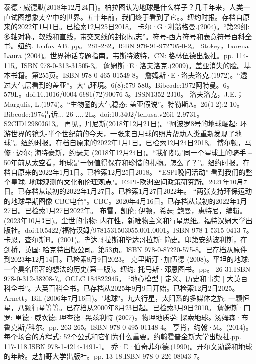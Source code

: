 \begin{enumerate}
 泰德·威德默(2018年12月24日)。柏拉图认为地球是什么样子？几千年来，人类一直试图想象太空中的世界。五十年前，我们终于看到了它。。纽约时报。存档自原来的2022年1月1日。已检索12月25日2018。
 卡尔·G·利翁格曼.(2004)。“第29组: 多轴对称，软线和直线，带交叉线的封闭标志”。符号-西方符号和表意符号百科全书。纽约: Ionfox AB. pp。 281-282。ISBN 978-91-972705-0-2。
 Stokey，Lorena Laura (2004)。世界神话专题指南。韦斯特波特，CN: 格林伍德出版社。pp. 114-115。ISBN 978-0-313-31505-3。
 詹姆斯·E·洛夫洛克.(2009)。盖亚消失的脸。基本书籍。第255页。ISBN 978-0-465-01549-8。
 詹姆斯·E·洛夫洛克.(1972)。“透过大气层看到的盖亚”。大气环境。6(8):579-580。Bibcode:1972阿特曼。6。579L。doi:10.1016/0004-6981(72)90076-5。ISSN1352-2310。 
 洛夫洛克，J.E.；Margulis, L.(1974)。“生物圈的大气稳态: 盖亚假说”。特勒斯A。26(1-2):2-10。Bibcode:1974告诉... 26 .... 2L。doi:10.3402/tellusa.v26i1-2.9731。S2CID129803613。 
 再见，丹尼斯(2018年12月21日)。“阿波罗8号的地球崛起: 环游世界的镜头-半个世纪前的今天，一张来自月球的照片帮助人类重新发现了地球”。纽约时报。存档自原来的2022年1月1日。已检索12月24日2018。
 博尔顿，马修·迈尔; 海特豪斯，约瑟夫 (2018年12月24日)。“我们都是同一个星球上的骑手 -- 50年前从太空看，地球是一份值得保存和珍惜的礼物。怎么了？”。纽约时报。存档自原来的2022年1月1日。已检索12月25日2018。
 “ESPI晚间活动” 看到我们的整个星球: 地球观测的文化和伦理观点"。ESPI-欧洲空间政策研究所。2021年10月7日。已存档从最初的2022年1月27日。已检索1月27日2022年。
 “两张支持环保运动的地球早期图像-CBC电台”。CBC。2020年4月16日。已存档从最初的2022年1月27日。已检索1月27日2022年。
 布雷，凯伦; 伊顿，希瑟; 鲍曼，惠特尼，编辑。(2023年10月3日)。尘世的事物: 内在性，新唯物主义和行星思维。福特汉姆大学出版社。doi:10.5422/福特汉姆/9781531503055.001.0001。ISBN 978-1-5315-0413-7。
 卡恩，查尔斯H。(2001)。毕达哥拉斯和毕达哥拉斯: 简史。印第安纳波利斯，在剑桥，英国: 哈克特出版公司。第53页。ISBN 978-0-87220-575-8。已存档从原件到2023年12月14日。已检索8月9日2023。
 克里斯汀·加伍德 (2008)。平坦的地球: 一个臭名昭著的想法的历史(第一版)。纽约: 托马斯·邓恩图书。pp。 26-31.ISBN 978-0-312-38208-7。OCLC 184822945。
 “地心模型 | 定义、历史和事实 | 大英百科全书”。大英百科全书。已存档从2025年9月9日开始。已检索12月2日2025。
 Arnett，Bill (2006年7月16日)。"地球"。九大行星，太阳系的多媒体之旅: 一颗恒星，八颗行星等等。已存档从2000年8月23日起。已检索3月9日2010。
 詹姆斯·门罗; 里德·威坎德; 理查德·黑兹利特 (2007)。物理地质学: 探索地球。汤姆森·布鲁克斯/科尔。pp. 263-265。ISBN 978-0-495-01148-4。
 亨肖，约翰·M。(2014)。每个场合的方程式: 52个公式和它们为什么重要。约翰霍普金斯大学出版社.pp. 117-118.ISBN 978-1-4214-1491-1。
 乔·D·伯奇菲尔德.(1990)。开尔文勋爵和地球的年龄。芝加哥大学出版社。pp. 13-18.ISBN 978-0-226-08043-7。
 \end{enumerate}